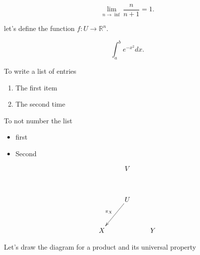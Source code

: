\documentclass{article}
\begin{document}
\[
\lim_{n\to\inf}\frac{n}{n+1}=1.
\]

let's define the function $f:U\to\mathbb{R}^{n}$.

$$
\int_{a}^{b}e^{-x^2}dx.
$$

To write a list of entries
\begin{enumerate}
\item 
The first item
\item
The second time
\end{enumerate}

To not number the list
\begin{itemize}
\item
first
\item
Second
\end{itemize}

\[
\xy0;/r.25pc/:
(0, 15)*+={V}="V";
(0, 0)*+{U}="U";
(-12.5,-15)*+{X}="X";
(12.5,-15)*+{Y}="Y";
{\ar"U";"X"_{\pi_{X}}}
\endxy
\]

Let's draw the diagram for a product and its universal property
\end{document}
